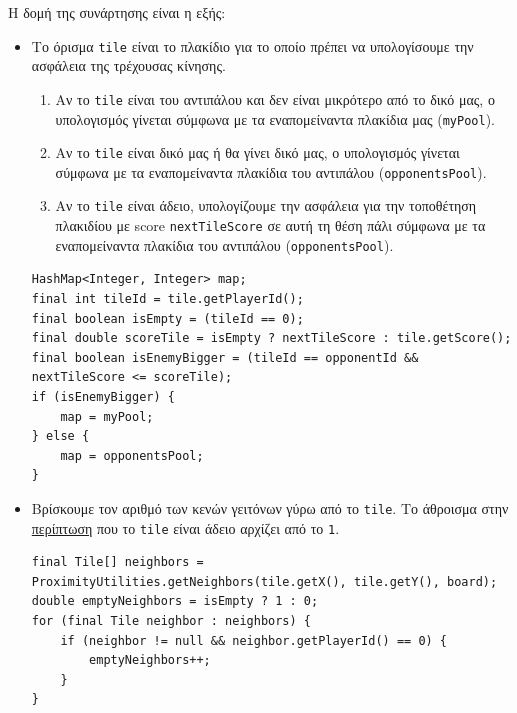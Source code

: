 Η δομή της συνάρτησης είναι η εξής:
\begin{itemize}
\item Το όρισμα \lstinline!tile! είναι το πλακίδιο για το οποίο πρέπει να υπολογίσουμε την ασφάλεια της τρέχουσας κίνησης.
\begin{enumerate}
\item \label{tile:isEnemyBigger}
Αν το \lstinline!tile! είναι του αντιπάλου και δεν είναι μικρότερο από το δικό μας, ο υπολογισμός γίνεται σύμφωνα με τα εναπομείναντα πλακίδια μας (\lstinline!myPool!).

\item \label{tile:tileIdMy}
Αν το \lstinline!tile! είναι δικό μας ή θα γίνει δικό μας,
ο υπολογισμός γίνεται σύμφωνα με τα εναπομείναντα πλακίδια του αντιπάλου (\lstinline!opponentsPool!).

\item \label{tile:tileId0}
Αν το \lstinline!tile! είναι άδειο, υπολογίζουμε την ασφάλεια για την τοποθέτηση πλακιδίου με score
\lstinline!nextTileScore! σε αυτή τη θέση πάλι σύμφωνα με τα εναπομείναντα πλακίδια του αντιπάλου (\lstinline!opponentsPool!).

\end{enumerate}
\begin{lstlisting}[numbers=none, aboveskip=\smallskipamount, belowskip=\smallskipamount, captionpos=none]
HashMap<Integer, Integer> map;
final int tileId = tile.getPlayerId();
final boolean isEmpty = (tileId == 0);
final double scoreTile = isEmpty ? nextTileScore : tile.getScore();
final boolean isEnemyBigger = (tileId == opponentId && nextTileScore <= scoreTile);
if (isEnemyBigger) {
    map = myPool;
} else {
    map = opponentsPool;
}
\end{lstlisting}

\item Βρίσκουμε τον αριθμό των κενών γειτόνων γύρω από το \lstinline!tile!.
Το άθροισμα στην
\hyperref[tile:tileId0]{περίπτωση}
που το \lstinline!tile! είναι άδειο αρχίζει από το \lstinline!1!.
\begin{lstlisting}[numbers=none, aboveskip=\smallskipamount, belowskip=\smallskipamount, captionpos=none]
final Tile[] neighbors = ProximityUtilities.getNeighbors(tile.getX(), tile.getY(), board);
double emptyNeighbors = isEmpty ? 1 : 0;
for (final Tile neighbor : neighbors) {
    if (neighbor != null && neighbor.getPlayerId() == 0) {
        emptyNeighbors++;
    }
}
\end{lstlisting}


\end{itemize}

